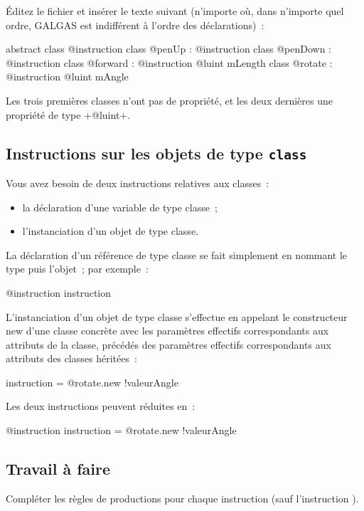 Éditez le fichier  et insérer le texte suivant (n’importe où, dans n’importe quel ordre, GALGAS est indifférent à l’ordre des déclarations)~:

\begin{galgas3}
abstract class @instruction {
}
class @penUp : @instruction {
}
class @penDown : @instruction {
}
class @forward : @instruction {
  @luint mLength
}
class @rotate : @instruction {
  @luint mAngle
}
\end{galgas3}


Les trois premières classes n'ont pas de propriété, et les deux dernières une propriété de type \ggst+@luint+.

\subsection{Instructions sur les objets de type \texttt{class}}

Vous avez besoin de deux instructions relatives aux classes~:
\begin{itemize}
  \item la déclaration d'une variable de type classe~;
  \item l'instanciation d'un objet de type classe.
\end{itemize}

La déclaration d'un référence de type classe se fait simplement en nommant le type puis l'objet~; par exemple~:
\begin{galgas3}
@instruction instruction
\end{galgas3}

L'instanciation d'un objet de type classe s'effectue en appelant le constructeur new d'une classe concrète avec les paramètres effectifs correspondants aux attributs de la classe, précédés des paramètres effectifs correspondants aux attributs des classes héritées~:
\begin{galgas3}
instruction = @rotate.new {!valeurAngle}
\end{galgas3}

Les deux instructions peuvent réduites en~:
\begin{galgas3}
@instruction instruction = @rotate.new {!valeurAngle}
\end{galgas3}

\subsection{Travail à faire}
Compléter les règles de productions pour chaque instruction (sauf l'instruction ).


